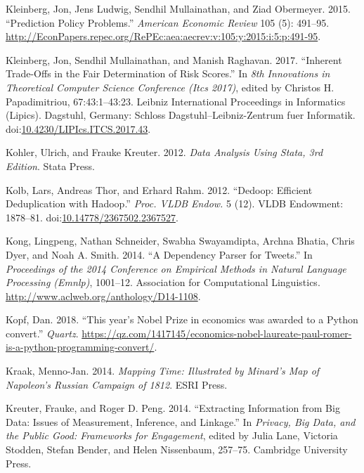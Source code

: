\documentclass[]{krantz}
\begin{document}
\hypertarget{ref-Kleinberg2015}{}
Kleinberg, Jon, Jens Ludwig, Sendhil Mullainathan, and Ziad Obermeyer.
2015. ``Prediction Policy Problems.'' \emph{American Economic Review}
105 (5): 491--95.
\url{http://EconPapers.repec.org/RePEc:aea:aecrev:v:105:y:2015:i:5:p:491-95}.

\hypertarget{ref-kleinberg2017}{}
Kleinberg, Jon, Sendhil Mullainathan, and Manish Raghavan. 2017.
``Inherent Trade-Offs in the Fair Determination of Risk Scores.'' In
\emph{8th Innovations in Theoretical Computer Science Conference (Itcs
2017)}, edited by Christos H. Papadimitriou, 67:43:1--43:23. Leibniz
International Proceedings in Informatics (Lipics). Dagstuhl, Germany:
Schloss Dagstuhl--Leibniz-Zentrum fuer Informatik.
doi:\href{https://doi.org/10.4230/LIPIcs.ITCS.2017.43}{10.4230/LIPIcs.ITCS.2017.43}.

\hypertarget{ref-kohler2012datenanalyse}{}
Kohler, Ulrich, and Frauke Kreuter. 2012. \emph{Data Analysis Using
Stata, 3rd Edition}. Stata Press.

\hypertarget{ref-kolb2012}{}
Kolb, Lars, Andreas Thor, and Erhard Rahm. 2012. ``Dedoop: Efficient
Deduplication with Hadoop.'' \emph{Proc. VLDB Endow.} 5 (12). VLDB
Endowment: 1878--81.
doi:\href{https://doi.org/10.14778/2367502.2367527}{10.14778/2367502.2367527}.

\hypertarget{ref-kong-14}{}
Kong, Lingpeng, Nathan Schneider, Swabha Swayamdipta, Archna Bhatia,
Chris Dyer, and Noah A. Smith. 2014. ``A Dependency Parser for Tweets.''
In \emph{Proceedings of the 2014 Conference on Empirical Methods in
Natural Language Processing (Emnlp)}, 1001--12. Association for
Computational Linguistics.
\url{http://www.aclweb.org/anthology/D14-1108}.

\hypertarget{ref-Kopf}{}
Kopf, Dan. 2018. ``This year's Nobel Prize in economics was awarded to a
Python convert.'' \emph{Quartz}.
\url{https://qz.com/1417145/economics-nobel-laureate-paul-romer-is-a-python-programming-convert/}.

\hypertarget{ref-Kraak2014}{}
Kraak, Menno-Jan. 2014. \emph{Mapping Time: Illustrated by Minard's Map
of Napoleon's Russian Campaign of 1812}. ESRI Press.

\hypertarget{ref-kreuter201412}{}
Kreuter, Frauke, and Roger D. Peng. 2014. ``Extracting Information from
Big Data: Issues of Measurement, Inference, and Linkage.'' In
\emph{Privacy, Big Data, and the Public Good: Frameworks for
Engagement}, edited by Julia Lane, Victoria Stodden, Stefan Bender, and
Helen Nissenbaum, 257--75. Cambridge University Press.
\end{document}
